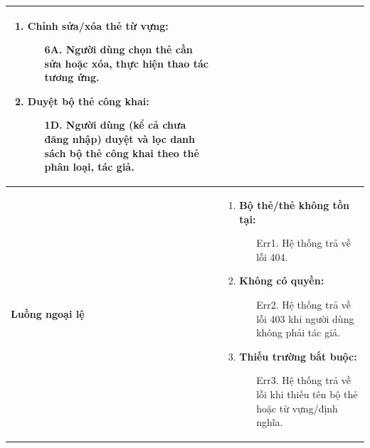 {\begin{tabularx}{\textwidth}{|>{\raggedright\arraybackslash}p{3.5cm}|>{\raggedright\arraybackslash}X|}
\begin{enumerate}
\begin{enumerate}
    \end{enumerate}
    \item \textbf{Chỉnh sửa/xóa thẻ từ vựng:}
    \begin{enumerate}
        \item[6A.] Người dùng chọn thẻ cần sửa hoặc xóa, thực hiện thao tác tương ứng.
    \end{enumerate}
    \item \textbf{Duyệt bộ thẻ công khai:}
    \begin{enumerate}
        \item[1D.] Người dùng (kể cả chưa đăng nhập) duyệt và lọc danh sách bộ thẻ công khai theo thẻ phân loại, tác giả.
    \end{enumerate}
\end{enumerate} \\
\hline
\textbf{Luồng ngoại lệ} &
\begin{enumerate}
    \item \textbf{Bộ thẻ/thẻ không tồn tại:}
    \begin{enumerate}
        \item[Err1.] Hệ thống trả về lỗi 404.
    \end{enumerate}
    \item \textbf{Không có quyền:}
    \begin{enumerate}
        \item[Err2.] Hệ thống trả về lỗi 403 khi người dùng không phải tác giả.
    \end{enumerate}
    \item \textbf{Thiếu trường bắt buộc:}
    \begin{enumerate}
        \item[Err3.] Hệ thống trả về lỗi khi thiếu tên bộ thẻ hoặc từ vựng/định nghĩa.
    \end{enumerate}
\end{enumerate} \\
\hline
\end{tabularx}
}
